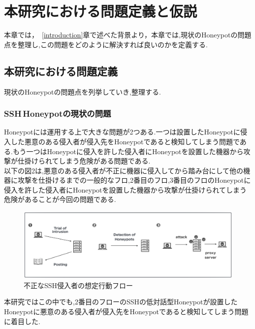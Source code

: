 \chapter{本研究における問題定義と仮説}
\label{approach}

本章では，~\ref{introduction}章で述べた背景より，本章では,現状のHoneypotの問題点を整理し,この問題をどのように解決すれば良いのかを定義する.

\section{本研究における問題定義}
\label{approach:problem}
現状のHoneypotの問題点を列挙していき,整理する.

\subsection{SSH\,Honeypotの現状の問題}
\label{approach:problemofSshHoneypot}
Honeypotには運用する上で大きな問題が2つある.一つは設置したHoneypotに侵入した悪意のある侵入者が侵入先をHoneypotであると検知してしまう問題である.もう一つはHoneypotに侵入を許した侵入者にHoneypotを設置した機器から攻撃が仕掛けられてしまう危険がある問題である.\\
以下の図2は,悪意のある侵入者が不正に機器に侵入してから踏み台にして他の機器に攻撃を仕掛けるまでの一般的なフロ,2番目のフロ,3番目のフロのHoneypotに侵入を許した侵入者にHoneypotを設置した機器から攻撃が仕掛けられてしまう危険があることが今回の問題である.

\vspace{10mm}
\begin{figure}[H]
    \centering
    \includegraphics[width=1.0\textwidth]{figures/nagare.png}
    \caption{不正なSSH侵入者の想定行動フロー}
    \label{fig:evo}
\end{figure}

本研究ではこの中でも,2番目のフローのSSHの低対話型Honeypotが設置したHoneypotに悪意のある侵入者が侵入先をHoneypotであると検知してしまう問題に着目した.

